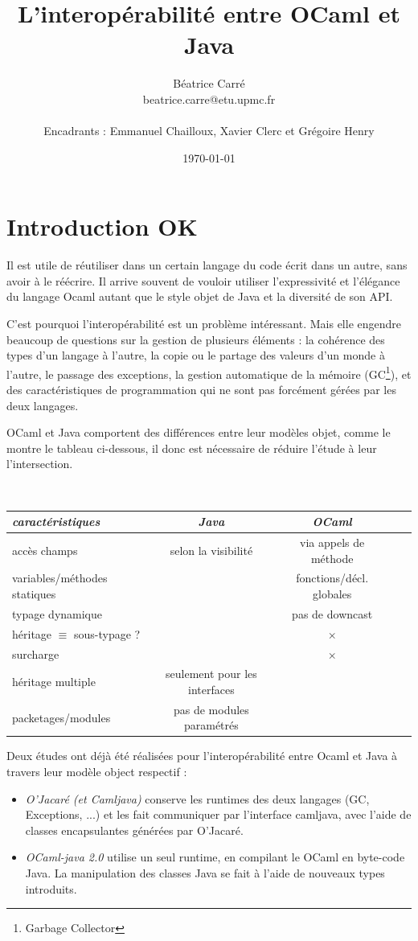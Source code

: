 \documentclass[a4paper, 11pt]{article}
\title{\vfill
  \huge L'interopérabilité entre OCaml et Java\\
}
\author{
  Béatrice Carré \\
  beatrice.carre@etu.upmc.fr \\
  \\
  Encadrants : Emmanuel Chailloux, Xavier Clerc et Grégoire Henry \\
}
\date{\today\vfill}
\begin{document}
\maketitle
\newpage
\tableofcontents
\newpage

\section*{Introduction OK}
Il est utile de réutiliser dans un certain langage du code
écrit dans un autre, sans avoir à le réécrire.
Il arrive souvent de vouloir utiliser l'expressivité et
l'élégance du langage Ocaml autant que le style objet de Java et la
diversité de son API.

C'est pourquoi l'interopérabilité est un problème intéressant.
Mais elle engendre beaucoup de questions sur la gestion de
plusieurs éléments :
la cohérence des types d'un langage à l'autre,
la copie ou le partage des valeurs d'un monde à l'autre,
le passage des exceptions,
la gestion automatique de la mémoire (GC\footnote{Garbage Collector}), 
et des caractéristiques de programmation qui ne sont pas forcément gérées par les
deux langages.

OCaml et Java comportent des différences entre leur modèles
objet, comme le montre le tableau ci-dessous, il donc est nécessaire
de réduire l'étude à leur l'intersection.

\ 
\newline
\noindent
\begin{tabular}{|l|c|c|c|c|}
  \hline
  \emph{caractéristiques} & \emph{Java} & \emph{OCaml} \\
  \hline
  accès champs & selon la visibilité & via appels de méthode\\\hline
  variables/méthodes statiques & \checkmark & fonctions/décl. globales\\\hline
  typage dynamique & \checkmark & pas de downcast \\\hline
  héritage $\equiv$ sous-typage ? &\checkmark  & $\times$ \\\hline
  surcharge & \checkmark & $\times$ \\\hline
  héritage multiple & seulement pour les interfaces & \checkmark\\
  \hline
  packetages/modules & pas de modules paramétrés & \checkmark\\\hline
\end{tabular}

Deux études ont déjà été réalisées pour l’interopérabilité entre
Ocaml et Java à travers leur modèle object respectif :
\begin{itemize}
\item \emph{O’Jacaré (et Camljava)} conserve les runtimes des deux langages (GC,
Exceptions, ...) et les fait communiquer par l'interface camljava,
avec l'aide de classes encapsulantes générées par O'Jacaré.

\item \emph{OCaml-java
  2.0} utilise un seul runtime, en compilant le OCaml en byte-code
Java. La manipulation des classes Java se fait à l'aide de nouveaux types introduits.
\end{itemize}
\end{document}
